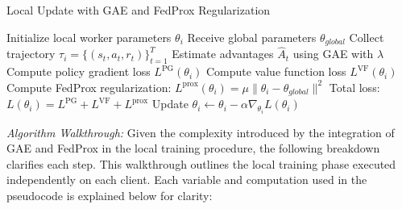 \documentclass[12pt,a4paper,twoside,openany]{book}
\begin{document}
\begin{algorithm}
\caption{Local Update with GAE and FedProx Regularization}
\begin{algorithmic}
\State Initialize local worker parameters $\theta_i$
\State Receive global parameters $\theta_{global}$
    \State Collect trajectory $\tau_i = \{(s_t, a_t, r_t)\}_{t=1}^{T}$
    \State Estimate advantages $\hat{A}_t$ using GAE with $\lambda$
    \State Compute policy gradient loss $L^{\text{PG}}(\theta_i)$
    \State Compute value function loss $L^{\text{VF}}(\theta_i)$
    \State Compute FedProx regularization: $L^{\text{prox}}(\theta_i) = \mu \|\theta_i - \theta_{global}\|^2$
    \State Total loss: $L(\theta_i) = L^{\text{PG}} + L^{\text{VF}} + L^{\text{prox}}$
    \State Update $\theta_i \gets \theta_i - \alpha \nabla_{\theta_i} L(\theta_i)$
\EndFor
\end{algorithmic}
\end{algorithm}

\smallskip
\noindent\textit{Algorithm Walkthrough:}
Given the complexity introduced by the integration of GAE and FedProx in the local training procedure, the following breakdown clarifies each step. This walkthrough outlines the local training phase executed independently on each client. Each variable and computation used in the pseudocode is explained below for clarity:
\end{document}
